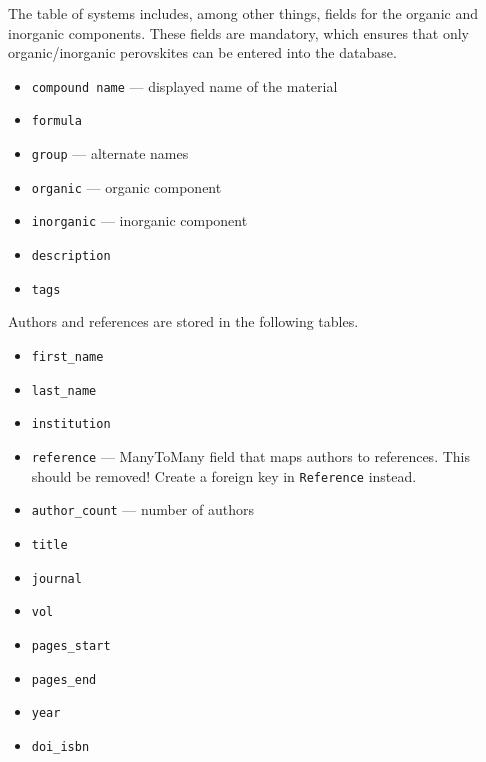 \documentclass{article}
\begin{document}
The table of systems includes, among other things, fields for the organic and inorganic components. These fields are mandatory, which ensures that only organic/inorganic perovskites can be entered into the database.
\begin{tcolorbox}[colback=green!5,colframe=green!40!black,title=System(Base)]
  \begin{itemize}
  \item \texttt{compound name} --- displayed name of the material
  \item \texttt{formula}
  \item \texttt{group} --- alternate names
  \item \texttt{organic} --- organic component
  \item \texttt{inorganic} --- inorganic component
  \item \texttt{description}
  \item \texttt{tags}
  \end{itemize}
\end{tcolorbox}

Authors and references are stored in the following tables.
\begin{tcolorbox}[colback=green!5,colframe=green!40!black,title=Author(Base)]
  \begin{itemize}
  \item \texttt{first\_name}
  \item \texttt{last\_name}
  \item \texttt{institution}
  \item \texttt{reference} --- ManyToMany field that maps authors to references. This should be removed! Create a foreign key in \texttt{Reference} instead.
  \end{itemize}
\end{tcolorbox}
\begin{tcolorbox}[colback=green!5,colframe=green!40!black,title=Reference(Base)]
  \begin{itemize}
  \item \texttt{author\_count} --- number of authors
  \item \texttt{title}
  \item \texttt{journal}
  \item \texttt{vol}
  \item \texttt{pages\_start}
  \item \texttt{pages\_end}
  \item \texttt{year}
  \item \texttt{doi\_isbn}
  \end{itemize}
\end{tcolorbox}
\end{document}
